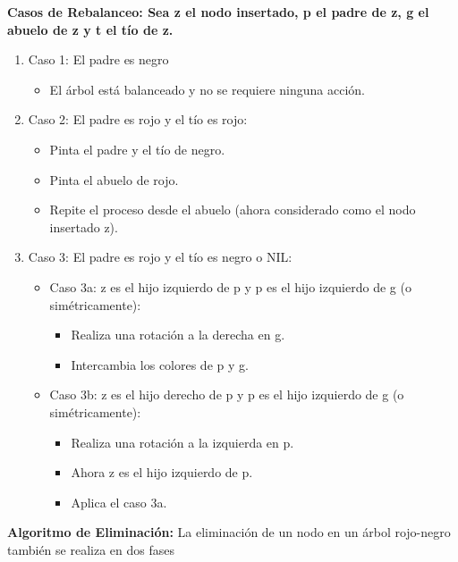 \documentclass[12pt]{article}
\begin{document}
\textbf{Casos de Rebalanceo: Sea z el nodo insertado, p el padre de z, g el abuelo de z y t el tío de z.}
\begin{enumerate}
    \item Caso 1: El padre es negro
    \begin{itemize}
        \item El árbol está balanceado y no se requiere ninguna acción.
    \end{itemize}
    \item Caso 2: El padre es rojo y el tío es rojo: 
    \begin{itemize}
        \item Pinta el padre y el tío de negro.
        \item Pinta el abuelo de rojo.
        \item Repite el proceso desde el abuelo (ahora considerado como el nodo insertado z).
    \end{itemize}
    \item Caso 3: El padre es rojo y el tío es negro o NIL:
    \begin{itemize}
        \item Caso 3a: z es el hijo izquierdo de p y p es el hijo izquierdo de g (o simétricamente):
        \begin{itemize}
            \item Realiza una rotación a la derecha en g.
            \item Intercambia los colores de p y g.
        \end{itemize}
        \item Caso 3b: z es el hijo derecho de p y p es el hijo izquierdo de g (o simétricamente):
        \begin{itemize}
            \item Realiza una rotación a la izquierda en p.
            \item Ahora z es el hijo izquierdo de p.
            \item Aplica el caso 3a.
        \end{itemize}
    \end{itemize}
\end{enumerate}
\textbf{Algoritmo de Eliminación:}
La eliminación de un nodo en un árbol rojo-negro también se realiza en dos fases
\end{document}
